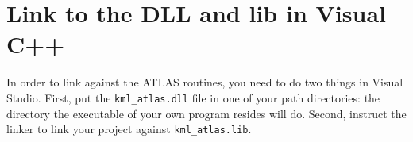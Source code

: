\documentclass{article}
\begin{document}
\section{Link to the DLL and lib in Visual C++}
\label{section:using_kml}

In order to link against the ATLAS routines, you need to do two things in 
Visual Studio.
First, put the \texttt{kml\_atlas.dll} file in one of your path
directories: the directory the executable of your
own program resides will do. Second, instruct the linker to link your 
project against \texttt{kml\_atlas.lib}.
\end{document}

